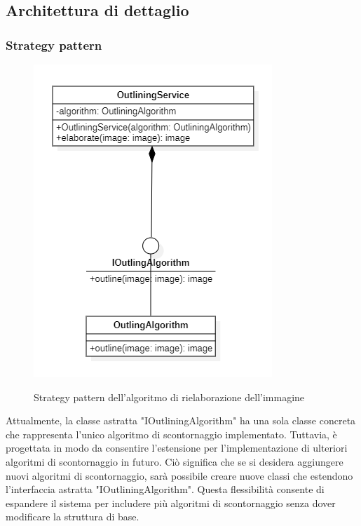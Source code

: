 \subsection{Architettura di dettaglio}

\subsubsection{Strategy pattern}

\begin{figure}[H]
    \centering
    \includegraphics[scale = 1.0]{img/outlineStrategy.png}\\
    \caption{Strategy pattern dell'algoritmo di rielaborazione dell'immagine}
\end{figure}

Attualmente, la classe astratta "IOutliningAlgorithm" ha una sola classe concreta che rappresenta l'unico algoritmo 
di scontornaggio implementato. Tuttavia, è progettata in modo da consentire l'estensione per l'implementazione di ulteriori 
algoritmi di scontornaggio in futuro. Ciò significa che se si desidera aggiungere nuovi algoritmi di scontornaggio, 
sarà possibile creare nuove classi che estendono l'interfaccia astratta "IOutliningAlgorithm". 
Questa flessibilità consente di espandere il sistema per includere più algoritmi di scontornaggio senza dover 
modificare la struttura di base.

